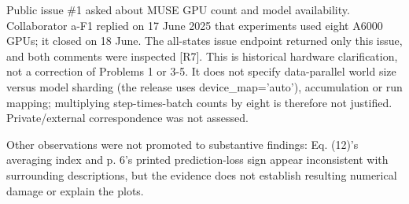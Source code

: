 \documentclass[10pt]{article}
\begin{document}
Public issue \#1 asked about MUSE GPU count and model availability. Collaborator a-F1 replied on 17 June 2025 that experiments used eight A6000 GPUs; it closed on 18 June. The all-states issue endpoint returned only this issue, and both comments were inspected [R7]. This is historical hardware clarification, not a correction of Problems 1 or 3-5. It does not specify data-parallel world size versus model sharding (the release uses device\_map=’auto’), accumulation or run mapping; multiplying step-times-batch counts by eight is therefore not justified. Private/external correspondence was not assessed.\par
Other observations were not promoted to substantive findings: Eq. (12)’s averaging index and p. 6’s printed prediction-loss sign appear inconsistent with surrounding descriptions, but the evidence does not establish resulting numerical damage or explain the plots.\par
\end{document}
